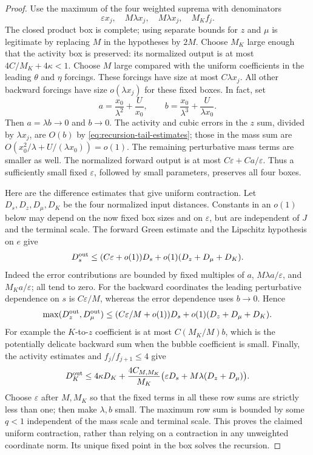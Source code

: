 \documentclass[11pt]{article}
\begin{document}
\begin{proof}
Use the maximum of the four weighted suprema with denominators
\[
 \varepsilon x_j,\quad M\lambda x_j,\quad M\lambda x_j,
 \quad M_K f_j.
\]
The closed product box is complete; using separate bounds for \(z\)
and \(\mu\) is legitimate by replacing \(M\) in the hypotheses
by \(2M\).  Choose \(M_K\) large enough that the activity box is
preserved: its normalized output is at most
\(4C/M_K+4\kappa<1\).  Choose \(M\) large compared with the
uniform coefficients in the leading \(\theta\) and \(\eta\)
forcings.  These forcings have size at most \(C\lambda x_j\).
All other backward forcings have size \(o(\lambda x_j)\) for
these fixed boxes.  In fact, set
\[
 a=\frac{x_0}{\lambda^2}+\frac U{x_0},\qquad
 b=\frac{x_0}{\lambda^3}+\frac U{\lambda x_0}.
\]
Then \(a=\lambda b\to0\) and \(b\to0\).  The activity and
cubic errors in the \(z\) sum, divided by \(\lambda x_j\),
are \(O(b)\) by \eqref{eq:recursion-tail-estimates}; those in
the mass sum are \(O(x_0^2/\lambda+U/(\lambda x_0))=o(1)\).
The remaining perturbative mass terms are smaller as well.
The normalized forward output is at most
\(C\varepsilon+Ca/\varepsilon\).  Thus a sufficiently small
fixed \(\varepsilon\), followed by small parameters, preserves
all four boxes.

Here are the difference estimates that give uniform contraction.
Let \(D_s,D_z,D_\mu,D_K\) be the four normalized input distances.
Constants in an \(o(1)\) below may depend on the now fixed box
sizes and on \(\varepsilon\), but are independent of \(J\)
and the terminal scale.  The forward Green estimate and the
Lipschitz hypothesis on \(e\) give
\[
 D_s^{\rm out}\le(C\varepsilon+o(1))D_s
                  +o(1)(D_z+D_\mu+D_K).
\]
Indeed the error contributions are bounded by fixed multiples of
\(a\), \(M\lambda a/\varepsilon\), and
\(M_Ka/\varepsilon\); all tend to zero.
For the backward coordinates the leading perturbative dependence on
\(s\) is \(C\varepsilon/M\), whereas the error dependence
uses \(b\to0\).  Hence
\[
 \max(D_z^{\rm out},D_\mu^{\rm out})
 \le(C\varepsilon/M+o(1))D_s
       +o(1)(D_z+D_\mu+D_K).
\]
For example the \(K\)-to-\(z\) coefficient is at most
\(C(M_K/M)b\), which is the potentially delicate backward
sum when the bubble coefficient is small.
Finally, the activity estimates and \(f_j/f_{j+1}\le4\) give
\[
 D_K^{\rm out}\le4\kappa D_K+
 \frac{4C_{M,M_K}}{M_K}
       \bigl(\varepsilon D_s+M\lambda(D_z+D_\mu)\bigr).
\]
Choose \(\varepsilon\) after \(M,M_K\) so that the fixed
terms in all these row sums are strictly less than one; then make
\(\lambda,b\) small.  The maximum row sum is bounded by some
\(q<1\) independent of the mass scale and terminal scale.
This proves the claimed uniform contraction, rather than relying
on a contraction in any unweighted coordinate norm.  Its unique
fixed point in the box solves the recursion.


\end{proof}
\end{document}
